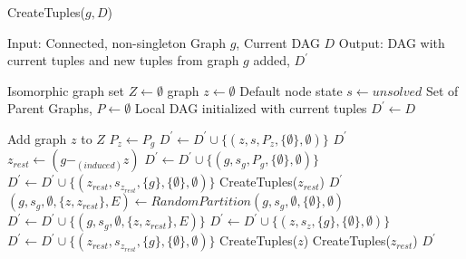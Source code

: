\begin{algorithm}
\caption{CreateTuples($g,D$)} 
\label{alg:alg02}
\begin{algorithmic}
\STATE Input: Connected, non-singleton Graph $g$, Current DAG $D$
\STATE Output: DAG with current tuples and new tuples from graph $g$ added, $D^{'}$
\end{algorithmic}
\begin{algorithmic}[1]
\STATE Isomorphic graph set $Z \leftarrow \emptyset$
\STATE graph $ z  \leftarrow　\emptyset $
\STATE Default node state $s  \leftarrow unsolved$
\STATE Set of Parent Graphs, $P \leftarrow \emptyset$
\STATE Local DAG initialized with current tuples $D^{'} \leftarrow D$

\STATE Add graph $z$ to $Z$ 
\ENDIF
\ENDFOR
{} 
\STATE $P_{z} \leftarrow P_{g}$
\STATE $D^{'} \leftarrow D^{'} \cup \{(z,s,P_z ,\{\emptyset \} ,\emptyset)\}$
\RETURN $D^{'}$
\ELSE
{}
\STATE \ $z_{rest}  \leftarrow  (g -_{(induced)} z)$
\STATE $D^{'}  \leftarrow D^{'} \cup \{(g,s_{g},P_g,\{ \emptyset \} , \emptyset )\}$
\STATE $D^{'}  \leftarrow D^{'} \cup \{(z_{rest},s_{z_{rest}},\{g\},\{\emptyset \} , \emptyset )\}$
\STATE CreateTuples($z_{rest}$)
\RETURN  $D^{'}$
\ENDIF
\ENDFOR
\ENDIF
\ENDWHILE
\STATE  $(g,s_{g},\emptyset,\{z,z_{rest}\},E) \leftarrow RandomPartition(g,s_{g},\emptyset,\{\emptyset \}, \emptyset )$
\STATE $D^{'}  \leftarrow D^{'} \cup \{(g,s_{g},\emptyset,\{z,z_{rest}\},E)\}$
\STATE $D^{'}  \leftarrow D^{'} \cup \{(z,s_{z},\{g\},\{ \emptyset \}, \emptyset )\}$
\STATE $D^{'}  \leftarrow D^{'} \cup \{(z_{rest},s_{z_{rest}},\{g\}, \{ \emptyset \} , \emptyset )\}$
\STATE CreateTuples($z$)
\STATE CreateTuples($z_{rest}$) 
\RETURN $D^{'}$
\end{algorithmic}
\end{algorithm}


